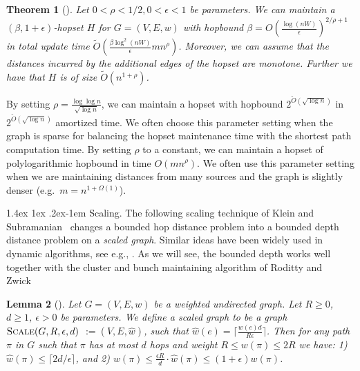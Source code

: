 \documentclass[11pt]{article}
\makeatletter
\newtheorem{theorem}{Theorem}[section]
\newtheorem{lemma}[theorem]{Lemma}
\theoremstyle{definition}
\theoremstyle{remark}
\renewcommand{\paragraph}{%
  \@startsection{paragraph}{4}%
  {\z@}{1.4ex \@plus 1ex \@minus .2ex}{-1em}%
  {\normalfont\normalsize\bfseries}%
}
\makeatother
\begin{document}
\begin{titlepage}
\begin{theorem}[\cite{LN2020}] \label{thm:hopset}
Let $0 < \rho < 1/2, 0< \epsilon <1$ be parameters. We can maintain a $(\beta,1+\epsilon)$-hopset $H$ for $G=(V,E,w)$ with hopbound $\beta =  O(\tfrac{\log(nW)}{\epsilon})^{2/\rho+1}$ in total update time $\tilde O (\tfrac{\beta\log^2(nW)}{\epsilon}mn^{\rho})$. Moreover, we can assume that the distances incurred by the additional edges of the hopset are monotone. Further we have that $H$ is of size $\tilde O(n^{1+\rho})$. 
\end{theorem}

By setting $\rho=\frac{\log \log n}{\sqrt{\log n}}$, we can maintain a hopset with hopbound $2^{\tilde{O}(\sqrt{\log n})}$ in $2^{\tilde{O}(\sqrt{\log n})}$ amortized time. We often choose this parameter setting when the graph is sparse for balancing the hopset maintenance time with the shortest path computation time.
By setting $\rho$ to a constant, we can maintain a hopset of polylogarithmic hopbound in time $O(mn^{\rho})$. We often use this parameter setting when we are maintaining distances from many sources and the graph is slightly denser (e.g.~$m=n^{1+\Omega(1)}$).

\paragraph{Scaling.}
The following scaling technique of Klein and Subramanian~\cite{KS97} changes a bounded hop distance problem into a bounded depth distance problem on a \textit{scaled graph}. Similar ideas have been widely used in dynamic algorithms, see e.g., \cite{Bernstein09,BR11,henzinger2014decremental,LN2020}. As we will see, the bounded depth works well together with the cluster and bunch maintaining algorithm of Roditty and Zwick~\cite{RZ12}
\begin{lemma}[\cite{KS97}]\label{lem:rounding}
Let $G=(V,E,w)$ be a weighted undirected graph. Let $R \geq 0$, $d \geq 1$, $\epsilon > 0$ be parameters.
We define a \emph{scaled graph} to be a graph $\textsc{Scale}(G, R, \epsilon, d)$ $:=  (V, E, \hat{w})$, such that $\hat{w}(e) = \lceil \tfrac{w(e)d}{R \epsilon} \rceil$.
Then for any path $\pi$ in $G$ such that $\pi$ has at most $d$ hops and weight $R \leq w(\pi) \leq 2R$ we have: 1) $\hat{w}(\pi) \leq \lceil 2d/\epsilon \rceil$, and 2) $w(\pi) \leq \tfrac{\epsilon R}{d} \cdot \hat{w}(\pi) \leq (1+\epsilon) w(\pi)$.
\end{lemma}


\end{titlepage}
\end{document}
